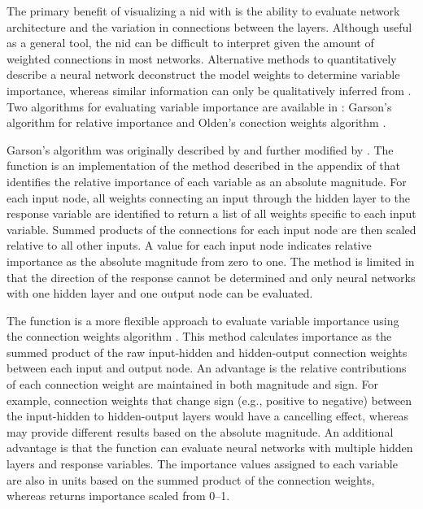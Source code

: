 \documentclass[article,shortnames]{jss}
\begin{document}
The primary benefit of visualizing a \ac{nid} with  is the ability to evaluate network architecture and the variation in connections between the layers.  Although useful as a general tool, the \ac{nid} can be difficult to interpret given the amount of weighted connections in most networks.  Alternative methods to quantitatively describe a neural network deconstruct the model weights to determine variable importance, whereas similar information can only be qualitatively inferred from .  Two algorithms for evaluating variable importance are available in : Garson's algorithm for relative importance \citep{Garson91,Goh95} and Olden's conection weights algorithm \citep{Olden04}.

Garson's algorithm was originally described by \citet{Garson91} and further modified by \citet{Goh95}.  The  function is an implementation of the method described in the appendix of \citet{Goh95} that identifies the relative importance of each variable as an absolute magnitude. For each input node, all weights connecting an input through the hidden layer to the response variable are identified to return a list of all weights specific to each input variable. Summed products of the connections for each input node are then scaled relative to all other inputs. A value for each input node indicates relative importance as the absolute magnitude from zero to one. The method is limited in that the direction of the response cannot be determined and only neural networks with one hidden layer and one output node can be evaluated.

The  function is a more flexible approach to evaluate variable importance using the connection weights algorithm \citep{Olden04}. This method calculates importance as the summed product of the raw input-hidden and hidden-output connection weights between each input and output node. An advantage is the relative contributions of each connection weight are maintained in both magnitude and sign. For example, connection weights that change sign (e.g., positive to negative) between the input-hidden to hidden-output layers would have a cancelling effect, whereas  may provide different results based on the absolute magnitude. An additional advantage is that the  function can evaluate neural networks with multiple hidden layers and response variables. The importance values assigned to each variable are also in units based on the summed product of the connection weights, whereas  returns importance scaled from 0--1.
\end{document}
